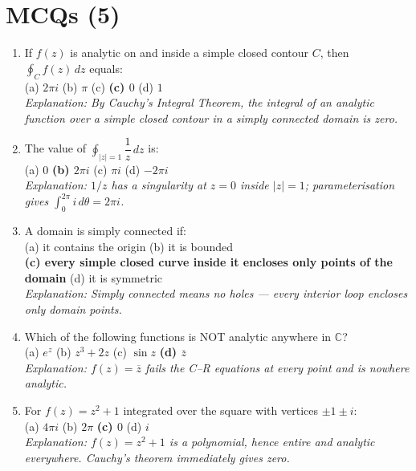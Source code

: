 \documentclass[12pt,a4paper]{article}
\begin{document}
\section{MCQs (5)}

\begin{enumerate}

  \item If $f(z)$ is analytic on and inside a simple closed contour $C$, then $\oint_{C}f(z)\,dz$ equals:\\
        (a) $2\pi i$ \quad (b) $\pi$ \quad (c) \textbf{(c) $0$} \quad (d) $1$\\
        \textit{Explanation: By Cauchy's Integral Theorem, the integral of an analytic function over
        a simple closed contour in a simply connected domain is zero.}

  \item The value of $\oint_{|z|=1}\dfrac{1}{z}\,dz$ is:\\
        (a) $0$ \quad \textbf{(b) $2\pi i$} \quad (c) $\pi i$ \quad (d) $-2\pi i$\\
        \textit{Explanation: $1/z$ has a singularity at $z=0$ inside $|z|=1$; parameterisation gives
        $\int_0^{2\pi} i\,d\theta = 2\pi i$.}

  \item A domain is simply connected if:\\
        (a) it contains the origin \quad (b) it is bounded\\
        \textbf{(c) every simple closed curve inside it encloses only points of the domain} \quad (d) it is symmetric\\
        \textit{Explanation: Simply connected means no holes --- every interior loop encloses only
        domain points.}

  \item Which of the following functions is NOT analytic anywhere in $\mathbb{C}$?\\
        (a) $e^z$ \quad (b) $z^3 + 2z$ \quad (c) $\sin z$ \quad \textbf{(d) $\overline{z}$}\\
        \textit{Explanation: $f(z)=\overline{z}$ fails the C--R equations at every point and is
        nowhere analytic.}

  \item For $f(z)=z^2+1$ integrated over the square with vertices $\pm 1 \pm i$:\\
        (a) $4\pi i$ \quad (b) $2\pi$ \quad \textbf{(c) $0$} \quad (d) $i$\\
        \textit{Explanation: $f(z)=z^2+1$ is a polynomial, hence entire and analytic everywhere.
        Cauchy's theorem immediately gives zero.}

\end{enumerate}
\end{document}
